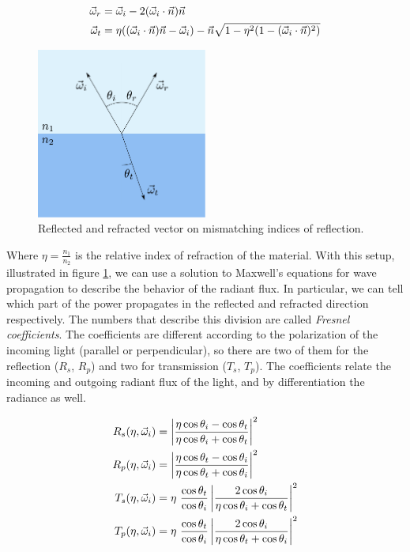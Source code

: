 \begin{equation*}
\begin{split}
\vec{\omega}_r &= \vec{\omega}_i - 2 (\vec{\omega}_i \cdot \vec{n}) \vec{n} \\
\vec{\omega}_t &= \eta ((\vec{\omega}_i \cdot \vec{n}) \vec{n} - \vec{\omega}_i) - \vec{n} \sqrt{1 - \eta^2 (1 - (\vec{\omega}_i \cdot \vec{n}) ^ 2)}
\end{split}
\end{equation*}

\begin{figure}[!ht]
\centering
\includegraphics[width=0.5\textwidth]{images/fresnelsetup.pdf}
\caption{Reflected and refracted vector on mismatching indices of reflection.}
\label{fig:fresnelsetup}
\end{figure}
 

Where $\eta = \frac{n_1}{n_2}$ is the relative index of refraction of the material. With this setup, illustrated in figure \ref{fig:fresnelsetup}, we can use a solution to Maxwell's equations for wave propagation to describe the behavior of the radiant flux. In particular, we can tell which part of the power propagates in the reflected and refracted direction respectively. The numbers that describe this division are called \emph{Fresnel coefficients}. The coefficients are different according to the polarization of the incoming light (parallel or perpendicular), so there are two of them for the reflection ($R_s$, $R_p$) and two for transmission ($T_s$, $T_p$). The coefficients relate the incoming and outgoing radiant flux of the light, and by differentiation the radiance as well.

\begin{equation*}
\begin{split}
R_s(\eta,\vec{\omega}_i) &= \left|\frac{\eta  \cos\theta_i -  \cos\theta_t} {\eta  \cos\theta_i +  \cos\theta_t}\right|^2 \\
R_p(\eta,\vec{\omega}_i) &= \left|\frac{\eta  \cos\theta_t -  \cos\theta_i} {\eta  \cos\theta_t +  \cos\theta_i}\right|^2\\
T_s(\eta,\vec{\omega}_i) &= \eta \  \frac{ \cos\theta_t}{ \cos\theta_i} \left|\frac{2  \cos\theta_i}{\eta  \cos\theta_i +  \cos\theta_t}\right|^2 \\
T_p(\eta,\vec{\omega}_i) &= \eta \  \frac{ \cos\theta_t}{ \cos\theta_i}  \left|\frac{2  \cos\theta_i}{\eta  \cos\theta_t +  \cos\theta_i}\right|^2
\end{split}
\end{equation*}


